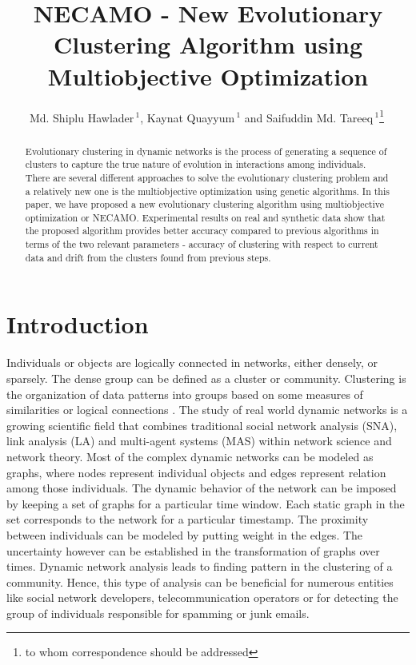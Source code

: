 \documentclass[12pt]{arsubmit}
\begin{document}
\title{NECAMO - New Evolutionary Clustering Algorithm using Multiobjective Optimization}
\author{Md. Shiplu Hawlader\,$^{1}$, Kaynat Quayyum\,$^{1}$ and Saifuddin Md. Tareeq\,$^{1}$\footnote{to whom correspondence should be addressed}$\  $}
\date{ }

\maketitle
\begin{abstract}
Evolutionary clustering in dynamic networks is the process of generating a sequence of clusters to capture the true nature of evolution in interactions among individuals. There are several different approaches to solve the evolutionary clustering problem and a relatively new one is the multiobjective optimization using genetic algorithms. In this paper, we have proposed a new evolutionary clustering algorithm using multiobjective optimization or NECAMO. Experimental results on real and synthetic data show that the proposed algorithm provides better accuracy compared to previous algorithms in terms of the two relevant parameters - accuracy of clustering with respect to current data and drift from the clusters found from previous steps.
\end{abstract}



\section{Introduction}
Individuals or objects are logically connected in networks, either densely, or sparsely. The dense group can be defined as a cluster or community. Clustering is the organization of data patterns into groups based on some measures of similarities or logical connections \cite{jain}. The study of real world dynamic networks is a growing scientific field that combines traditional social network analysis (SNA), link analysis (LA) and multi-agent systems (MAS) within network science and network theory. 
Most of the complex dynamic networks can be modeled as graphs, where nodes represent individual objects and edges represent relation among those individuals. The dynamic behavior of the network can be imposed by keeping a set of graphs for a particular time window. Each static graph in the set corresponds to the network for a particular timestamp. The proximity between individuals can be modeled by putting weight in the edges. The uncertainty however can be established in the transformation of graphs over times. Dynamic network analysis leads to finding pattern in the clustering of a community. Hence, this type of analysis can be beneficial for numerous entities like social network developers, telecommunication operators or for detecting the group of individuals responsible for spamming or junk emails.
\end{document}
